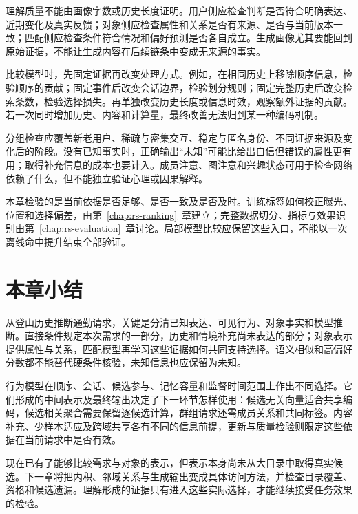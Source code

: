 理解质量不能由画像字数或历史长度证明。用户侧应检查判断是否符合明确表达、近期变化及真实反馈；对象侧应检查属性和关系是否有来源、是否与当前版本一致；匹配侧应检查条件符合情况和偏好预测是否各自成立。生成画像尤其要能回到原始证据，不能让生成内容在后续链条中变成无来源的事实。

比较模型时，先固定证据再改变处理方式。例如，在相同历史上移除顺序信息，检验顺序的贡献；固定事件后改变会话边界，检验划分规则；固定完整历史后改变检索条数，检验选择损失。再单独改变历史长度或信息时效，观察额外证据的贡献。若一次同时增加历史、内容和计算量，最终改善无法归到某一种编码机制。

分组检查应覆盖新老用户、稀疏与密集交互、稳定与匿名身份、不同证据来源及变化后的阶段。没有已知事实时，正确输出“未知”可能比给出自信但错误的属性更有用；取得补充信息的成本也要计入。成员注意、图注意和兴趣状态可用于检查网络依赖了什么，但不能独立验证心理或因果解释。

本章检验的是当前依据是否足够、是否一致及是否及时。训练标签如何校正曝光、位置和选择偏差，由第~\ref{chap:rs-ranking}~章建立；完整数据切分、指标与效果识别由第~\ref{chap:rs-evaluation}~章讨论。局部模型比较应保留这些入口，不能以一次离线命中提升结束全部验证。

\section{本章小结}
\label{sec:rs-understanding-summary}

从登山历史推断通勤请求，关键是分清已知表达、可见行为、对象事实和模型推断。直接条件规定本次需求的一部分，历史和情境补充尚未表达的部分；对象表示提供属性与关系，匹配模型再学习这些证据如何共同支持选择。语义相似和高偏好分数都不能替代硬条件核验，未知信息也应保留为未知。

行为模型在顺序、会话、候选参与、记忆容量和监督时间范围上作出不同选择。它们形成的中间表示及最终输出决定了下一环节怎样使用：候选无关向量适合共享编码，候选相关聚合需要保留逐候选计算，群组请求还需成员关系和共同标签。内容补充、少样本适应及跨域共享各有不同的信息前提，更新与质量检验则限定这些依据在当前请求中是否有效。

现在已有了能够比较需求与对象的表示，但表示本身尚未从大目录中取得真实候选。下一章将把内积、邻域关系与生成输出变成具体访问方法，并检查目录覆盖、资格和候选遗漏。理解形成的证据只有进入这些实际选择，才能继续接受任务效果的检验。
